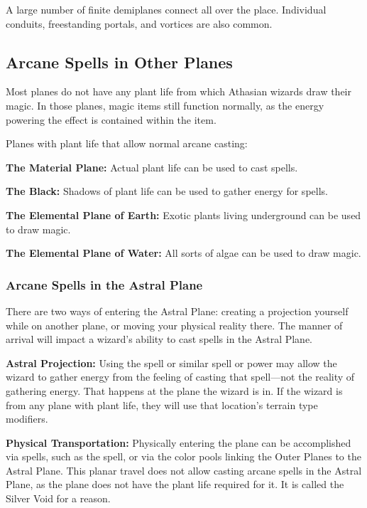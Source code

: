 A large number of finite demiplanes connect all over the place. Individual conduits, freestanding portals, and vortices are also common.

\subsection{Arcane Spells in Other Planes}
Most planes do not have any plant life from which Athasian wizards draw their magic. In those planes, magic items still function normally, as the energy powering the effect is contained within the item.

Planes with plant life that allow normal arcane casting:
\begin{itemize*}
\item \textbf{The Material Plane:} Actual plant life can be used to cast spells.
\item \textbf{The Black:} Shadows of plant life can be used to gather energy for spells.
\item \textbf{The Elemental Plane of Earth:} Exotic plants living underground can be used to draw magic.
\item \textbf{The Elemental Plane of Water:} All sorts of algae can be used to draw magic.
\end{itemize*}

\subsubsection{Arcane Spells in the Astral Plane}
There are two ways of entering the Astral Plane: creating a projection yourself while on another plane, or moving your physical reality there. The manner of arrival will impact a wizard's ability to cast spells in the Astral Plane.

\textbf{Astral Projection:} Using the  spell or similar spell or power may allow the wizard to gather energy from the feeling of casting that spell---not the reality of gathering energy. That happens at the plane the wizard is in. If the wizard is  from any plane with plant life, they will use that location's terrain type modifiers.

\textbf{Physical Transportation:} Physically entering the plane can be accomplished via spells, such as the  spell, or via the color pools linking the Outer Planes to the Astral Plane. This planar travel does not allow casting arcane spells in the Astral Plane, as the plane does not have the plant life required for it. It is called the Silver Void for a reason.


